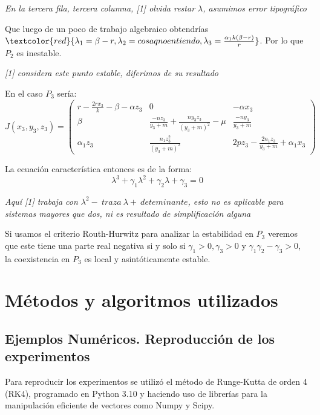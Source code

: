 \documentclass{wscpaperproc}
\theoremstyle{wsc}
\begin{document}
{\it En la tercera fila, tercera columna, [1] olvida restar $\lambda$, asumimos error tipográfico}

Que luego de un poco de trabajo algebraico obtendrías $\textcolor{red}{\lambda_1=\beta-r, \lambda_2=cosa q no entiendo, \lambda_3=\frac{\alpha_1 k(\beta-r)}{r}}$. Por lo que $P_2$ es inestable.

{\it [1] considera este punto estable, diferimos de su resultado}


\vspace*{0.5cm}

En el caso $P_3$ sería:
$$ J(x_3, y_3, z_3) = \left(
	\begin{array}{ccc}
			r-\frac{2rx_3}{k}-\beta-\alpha z_3 & 0                                                 & -\alpha x_3                             \\
			\beta                              & \frac{-nz_3}{y_3+m}+\frac{ny_3z_3}{(y_3+m)^2}-\mu & \frac{-ny_3}{y_3+m}                     \\
			\alpha_1z_3                        & \frac{n_1z_3^2}{(y_3+m)^2}                        & 2pz_3-\frac{2n_1z_3}{y_3+m}+\alpha_1x_3
		\end{array}
	\right)$$

La ecuación característica entonces es de la forma:
$$\lambda^3+\gamma_1\lambda^2+\gamma_2\lambda+\gamma_3=0 $$

{\it Aquí [1] trabaja con $\lambda^2-\ traza\ \lambda+\ deteminante$, esto no es aplicable para sistemas mayores que dos, ni
es resultado de simplificación alguna}

Si usamos el criterio Routh-Hurwitz para analizar la estabilidad en $P_3$ veremos que este
tiene una parte real negativa si y solo si $\gamma_1>0, \gamma_3>0$ y $\gamma_1\gamma_2-\gamma_3>0$, la coexistencia en $P_3$ es local
y asintóticamente estable.

\vspace*{3cm}


\section*{Métodos y algoritmos utilizados}


\subsection*{Ejemplos Numéricos. Reproducción de los experimentos}

Para reproducir los experimentos se utilizó el método de Runge-Kutta de orden 4 (RK4), programado
en Python 3.10 y haciendo uso de librerías para la manipulación eficiente de vectores como Numpy y
Scipy.
\end{document}
